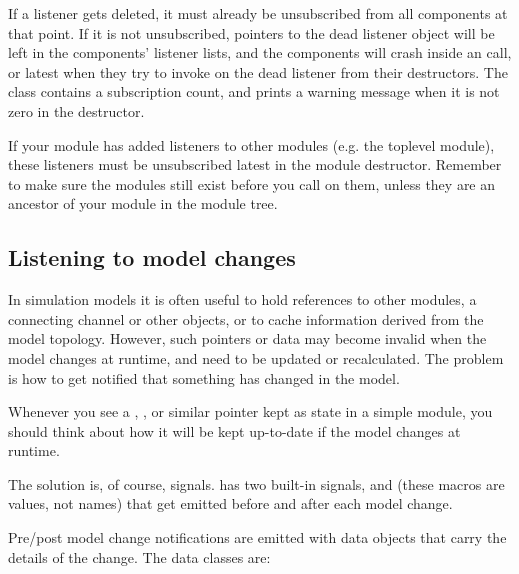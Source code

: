 If a listener gets deleted, it must already be unsubscribed from all
components at that point. If it is not unsubscribed, pointers to the dead
listener object will be left in the components' listener lists, and the
components will crash inside an  call, or latest when they
try to invoke  on the dead listener from their
destructors. The  class contains a subscription count,
and prints a warning message when it is not zero in the destructor.

\begin{note}
  If your module has added listeners to other modules (e.g. the toplevel
  module), these listeners must be unsubscribed latest in the module
  destructor. Remember to make sure the modules still exist before you
  call  on them, unless they are an ancestor
  of your module in the module tree.
\end{note}


\subsection{Listening to model changes}
\label{sec:ch-simple-modules:model-change}

In simulation models it is often useful to hold references to other
modules, a connecting channel or other objects, or to cache information
derived from the model topology. However, such pointers or data may
become invalid when the model changes at runtime, and need to be updated
or recalculated. The problem is how to get notified that something has
changed in the model.

\begin{note}
  Whenever you see a , ,  or
  similar pointer kept as state in a simple module, you should think about
  how it will be kept up-to-date if the model changes at runtime.
\end{note}

The solution is, of course, signals. {\opp} has two built-in signals,
 and  (these macros
are  values, not names) that get emitted before and
after each model change.

Pre/post model change notifications are emitted with data objects that
carry the details of the change. The data classes are:


